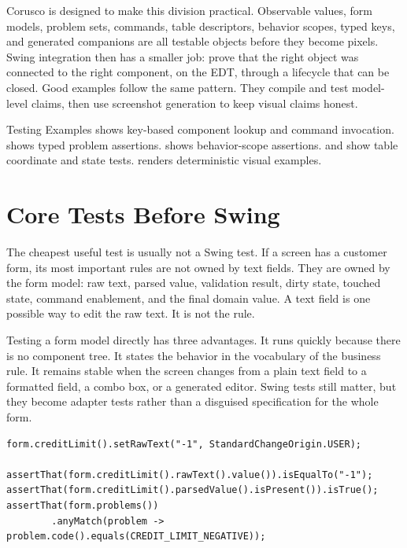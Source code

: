 Corusco is designed to make this division practical. Observable values, form models, problem sets, commands, table descriptors, behavior scopes, typed keys, and generated companions are all testable objects before they become pixels. Swing integration then has a smaller job: prove that the right object was connected to the right component, on the EDT, through a lifecycle that can be closed. Good examples follow the same pattern. They compile and test model-level claims, then use screenshot generation to keep visual claims honest.

\begin{examplebox}{Testing Examples}
 shows key-based component lookup and command invocation.  shows typed problem assertions.  shows behavior-scope assertions.  and  show table coordinate and state tests. \screenshotHarnessExample{} renders deterministic visual examples.
\end{examplebox}

\section{Core Tests Before Swing}

The cheapest useful test is usually not a Swing test. If a screen has a customer form, its most important rules are not owned by text fields. They are owned by the form model: raw text, parsed value, validation result, dirty state, touched state, command enablement, and the final domain value. A text field is one possible way to edit the raw text. It is not the rule.

Testing a form model directly has three advantages. It runs quickly because there is no component tree. It states the behavior in the vocabulary of the business rule. It remains stable when the screen changes from a plain text field to a formatted field, a combo box, or a generated editor. Swing tests still matter, but they become adapter tests rather than a disguised specification for the whole form.

\begin{lstlisting}[caption={Testing parsing and validation without Swing.}]
form.creditLimit().setRawText("-1", StandardChangeOrigin.USER);

assertThat(form.creditLimit().rawText().value()).isEqualTo("-1");
assertThat(form.creditLimit().parsedValue().isPresent()).isTrue();
assertThat(form.problems())
        .anyMatch(problem -> problem.code().equals(CREDIT_LIMIT_NEGATIVE));
\end{lstlisting}

